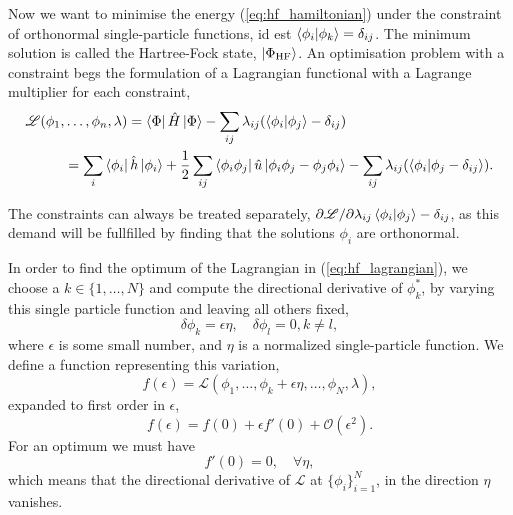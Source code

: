     Now we want to minimise the energy (\autoref{eq:hf_hamiltonian}) under the
    constraint of orthonormal single-particle functions, id est
    $\braket{\phi_i}{\phi_k} = \delta_{ij}$. The minimum solution is called the 
    Hartree-Fock state, $\ket{\Phi_{\text{HF}}}$. An optimisation problem with a 
    constraint begs the formulation of a Lagrangian functional with a Lagrange
    multiplier for each constraint,
    \begin{equation}
        \label{eq:hf_lagrangian}
        \begin{aligned}
        \mathscr{L}(\phi_1, &\dots, \phi_n, \lambda)
            = \bra{\Phi} \hat{H} \ket{\Phi} 
                - \sum_{ij}\lambda_{ij}(\braket{\phi_i}{\phi_j} - \delta_{ij}) \\
            &= \sum_i \bra{\phi_i} \hat{h} \ket{\phi_i}
                + \frac{1}{2}\sum_{ij} \bra{\phi_i \phi_j} 
                    \hat{u} \ket{\phi_i \phi_j -  \phi_j \phi_i}
                - \sum_{ij} \lambda_{ij} (\braket{\phi_i}{\phi_j - \delta_{ij}}).
        \end{aligned}
    \end{equation}

    The constraints can always be treated separately, 
    $\partial \mathscr{L}/\partial \lambda_{ij} \braket{\phi_i}{\phi_j} - \delta_{ij}$,
    as this demand will be fullfilled by finding that the solutions $\phi_i$ are 
    orthonormal.

    In order to find the optimum of the Lagrangian in (\autoref{eq:hf_lagrangian}),
    we choose a $k \in \{1, \dots, N \}$ and compute the directional derivative of
    $\phi_k^*$, by varying this single particle function and leaving all others fixed,
    \begin{equation}
        \delta \phi_k = \epsilon \eta, \quad \delta \phi_l = 0, k \neq l,
    \end{equation}
    where $\epsilon$ is some small number, and $\eta$ is a normalized single-particle 
    function. We define a function representing this variation,
    \begin{equation}
        \label{eq:variation_hf_lagrangian}
        f(\epsilon) = \mathscr{L} (\phi_1, \dots, \phi_k + \epsilon \eta,
            \dots, \phi_N, \lambda),
    \end{equation}
    expanded to first order in $\epsilon$,
    \begin{equation}
        f(\epsilon) = f(0) + \epsilon f'(0) + \mathscr{O}(\epsilon^2).
    \end{equation}
    For an optimum we must have 
    \begin{equation}
        f'(0) = 0, \quad \forall \eta,
    \end{equation}
    which means that the directional derivative of $\mathscr{L}$ at 
    $\{\phi_i\}_{i=1}^N$, in the direction $\eta$ vanishes.

